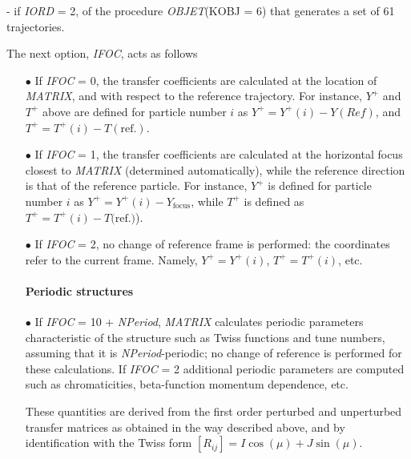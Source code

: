 \noindent - if  \textsl{IORD} = 2, of the procedure \textsl{OBJET}(KOBJ = 6)  that generates 
 a set of 61 trajectories. 


\bigskip

\noindent The next option, \textsl{IFOC}, acts as follows \par

\begin{itemize}
\item[$\bullet$] If \textsl{IFOC} = 0,  the transfer coefficients are calculated
at the location of \textsl{MATRIX}, and with respect to the reference trajectory. 
For instance, $ Y^+ $ and $ T^+ $ above are defined for particle number $ i $ as 
$Y^+=Y^+(i)-Y(Ref)$,  and $ T^+=T^+(i)-T(\textrm{ref.})$.  

\item[$\bullet$] If \textsl{IFOC} = 1, the transfer coefficients are calculated at the 
horizontal focus  closest to \textsl{MATRIX} (determined 
automatically), while the reference direction is that of the reference  particle. For 
instance, $ Y^+ $ is defined for particle number $ i $ as $ Y^+=Y^+(i) -Y_{\text{focus}} $, 
while  $ T^+ $ is defined as $ T^+=T^+(i)-T(\textrm{ref.)}$).  

\item[$\bullet$] If \textsl{IFOC} = 2, no change of reference frame is 
performed: the coordinates refer to the current frame. Namely, $ Y^+=Y^+(i)$, 
$ T^+=T^+(i)$,  etc. \

\paragraph{Periodic structures} 

\item[$\bullet$] If \textsl{IFOC} = 10  +  \textsl{NPeriod}, \textsl{MATRIX} calculates
 periodic parameters characteristic  of the structure 
such as Twiss functions and tune numbers, assuming that it is \textsl{NPeriod}-periodic; 
 no change of reference is performed for these calculations. 
If  \textsl{IFOC} = 2 additional 
periodic parameters are computed such as chromaticities, beta-function momentum dependence, 
 etc. 

These quantities are derived from the first order perturbed and unperturbed transfer 
matrices as obtained in the way described above, and by identification with the Twiss form $ [R_{ij}] 
= I \cos(\mu) + J \sin(\mu)$. 
\end{itemize}

